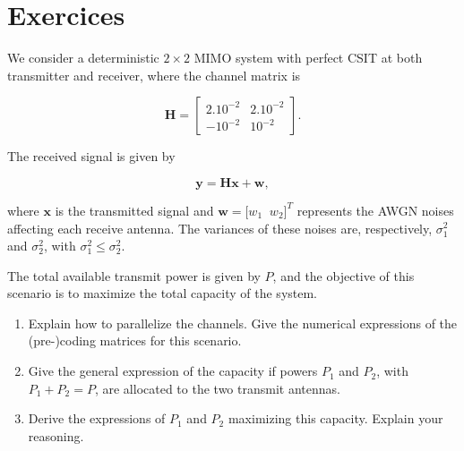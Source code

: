 \documentclass [a4paper, 11pt] {article}
\begin{document}
    \makesessiontitle

    \part*{Exercices}

    \begin{exercise}{1}

        We consider a deterministic $2\times 2$ MIMO system with perfect CSIT at both transmitter and receiver, where the channel matrix is

        \begin{equation}
            \mathbf{H} = \begin{bmatrix} 2.10^{-2} & 2.10^{-2} \\ -10^{-2} & 10^{-2} \end{bmatrix}.
        \end{equation}

        The received signal is given by

        \begin{equation}\mathbf{y=Hx+w},
        \end{equation}

        where $\mathbf{x}$ is the transmitted signal and $\mathbf{w} = \big[w_1 \; \; w_2\big]^T$ represents the AWGN noises affecting each receive antenna. The variances of these noises are, respectively, $\sigma_{1}^2$ and $\sigma_{2}^2$, with $\sigma_{1}^2 \leq \sigma_{2}^2$.

        The total available transmit power is given by $P$, and the objective of this scenario is to maximize the total capacity of the system.

        \begin{enumerate}
            \item Explain how to parallelize the channels. Give the numerical expressions of the (pre-)coding matrices for this scenario.
            \item Give the general expression of the capacity if powers $P_1$ and $P_2$, with $P_1 + P_2 = P$, are allocated to the two transmit antennas.
            \item Derive the expressions of $P_1$ and $P_2$ maximizing this capacity. Explain your reasoning.
        \end{enumerate}

    \end{exercise}
\end{document}
